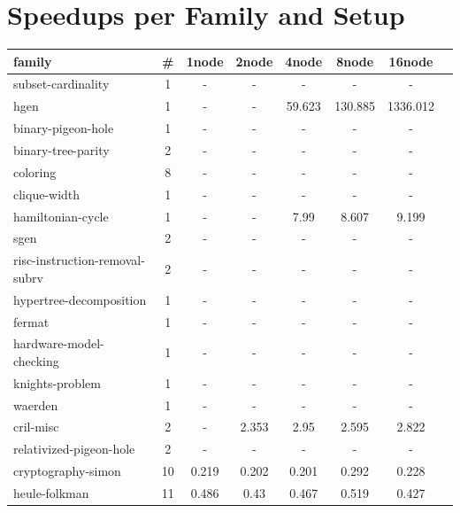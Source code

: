 \documentclass[12pt,a4paper,twoside]{scrartcl}
\numberwithin{equation}{section}
\begin{document}
\section{Speedups per Family and Setup}
\label{app:speedupsFamiliesComplete}
\begin{longtable}{ lccccccc }
  \toprule
  family	&	\#	&	1node	&	2node	&	4node	&	8node	&	16node\\
  \midrule
  subset-cardinality	            &	1	&	-	    &	-	    &	-	    &	-	    &	-	        \\
  hgen	                          &	1	&	-	    &	-	    &	59.623	&	130.885	&	1336.012    \\
  binary-pigeon-hole	            &	1	&	-	    &	-	    &	-	    &	-	    &	-	        \\
  binary-tree-parity	            &	2	&	-	    &	-	    &	-	    &	-	    &	-	        \\
  coloring	                      &	8	&	-	    &	-	    &	-	    &	-	    &	-	        \\
  clique-width	                  &	1	&	-	    &	-	    &	-	    &	-	    &	-	        \\
  hamiltonian-cycle	              &	1	&	-	    &	-	    &	7.99	&	8.607	&	9.199       \\
  sgen	                          &	2	&	-	    &	-	    &	-	    &	-	    &	-	        \\
  risc-instruction-removal-subrv  &	2	&	-	    &	-	    &	-	    &	-	    &	-	        \\
  hypertree-decomposition	        &	1	&	-	    &	-	    &	-	    &	-	    &	-	        \\
  fermat	                        &	1	&	-	    &	-	    &	-	    &	-	    &	-	        \\
  hardware-model-checking	        &	1	&	-	    &	-	    &	-	    &	-	    &	-	        \\
  knights-problem	                &	1	&	-	    &	-	    &	-	    &	-	    &	-	        \\
  waerden	                        &	1	&	-	    &	-	    &	-	    &	-	    &	-	        \\
  cril-misc	                      &	2	&	-	    &	2.353	&	2.95	&	2.595	&	2.822       \\
  relativized-pigeon-hole	        &	2	&	-	    &	-	    &	-	    &	-	    &	-	        \\
  cryptography-simon	            &	10	&	0.219	&	0.202	&	0.201	&	0.292	&	0.228       \\
  heule-folkman	                  &	11	&	0.486	&	0.43	&	0.467	&	0.519	&	0.427       \\

\end{longtable}
\end{document}
